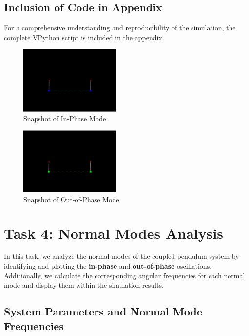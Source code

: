 \documentclass[12pt]{report} %
\begin{document}
\subsection{Inclusion of Code in Appendix}
\label{subsec:part1_task3_appendix}

For a comprehensive understanding and reproducibility of the simulation, the complete VPython script is included in the appendix.

\begin{figure}[h]
    \centering
    \includegraphics[width=0.45\textwidth]{in_phase_snapshot.png}
    \caption{Snapshot of In-Phase Mode}
    \label{fig:in_phase_snapshot}
\end{figure}

\begin{figure}[h]
    \centering
    \includegraphics[width=0.45\textwidth]{out_of_phase_snapshot.png}
    \caption{Snapshot of Out-of-Phase Mode}
    \label{fig:out_phase_snapshot}
\end{figure}

\newpage


\section{Task 4: Normal Modes Analysis}
\label{sec:part1_task4}

In this task, we analyze the normal modes of the coupled pendulum system by identifying and plotting the \textbf{in-phase} and \textbf{out-of-phase} oscillations. Additionally, we calculate the corresponding angular frequencies for each normal mode and display them within the simulation results.

\subsection{System Parameters and Normal Mode Frequencies}
\label{subsec:part1_task4_parameters}
\end{document}
